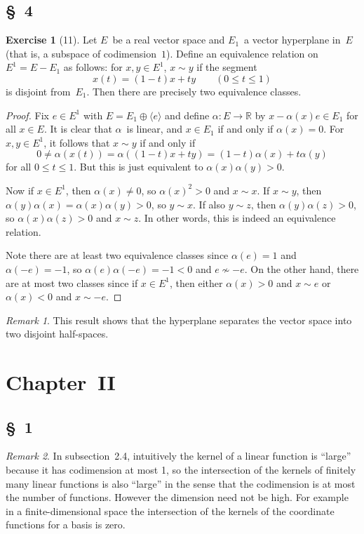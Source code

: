 \documentclass[letterpaper,12pt]{article}
\newcommand{\R}{\mathbb{R}}
\renewcommand{\equiv}{\sim}
\newcommand{\dsum}{\oplus}
\newcommand{\gen}[1]{\langle#1\rangle}
\theoremstyle{definition}
\newtheorem*{exer}{Exercise}
\theoremstyle{remark}
\newtheorem*{rmk}{Remark}
\begin{document}
\subsection*{\S~4}
\begin{exer}[11]
Let \(E\)~be a real vector space and \(E_1\)~a vector hyperplane in~\(E\) (that is, a subspace of codimension~\(1\)). Define an equivalence relation on \(E^1=E-E_1\) as follows: for \(x,y\in E^1\), \(x\equiv y\) if the segment
\[x(t)=(1-t)x+ty\qquad(0\le t\le 1)\]
is disjoint from~\(E_1\). Then there are precisely two equivalence classes.
\end{exer}
\begin{proof}
Fix \(e\in E^1\) with \(E=E_1\dsum\gen{e}\) and define \(\alpha:E\to\R\) by \(x-\alpha(x)e\in E_1\) for all \(x\in E\). It is clear that \(\alpha\)~is linear, and \(x\in E_1\) if and only if \(\alpha(x)=0\). For \(x,y\in E^1\), it follows that \(x\equiv y\) if and only if
\[0\ne\alpha(x(t))=\alpha((1-t)x+ty)=(1-t)\alpha(x)+t\alpha(y)\]
for all \(0\le t\le 1\). But this is just equivalent to \(\alpha(x)\alpha(y)>0\).

Now if \(x\in E^1\), then \(\alpha(x)\ne0\), so \(\alpha(x)^2>0\) and \(x\equiv x\). If \(x\equiv y\), then \(\alpha(y)\alpha(x)=\alpha(x)\alpha(y)>0\), so \(y\equiv x\). If also \(y\equiv z\), then \(\alpha(y)\alpha(z)>0\), so \(\alpha(x)\alpha(z)>0\) and \(x\equiv z\). In other words, this is indeed an equivalence relation.

Note there are at least two equivalence classes since \(\alpha(e)=1\) and \(\alpha(-e)=-1\), so \(\alpha(e)\alpha(-e)=-1<0\) and \(e\not\equiv -e\). On the other hand, there are at most two classes since if \(x\in E^1\), then either \(\alpha(x)>0\) and \(x\equiv e\) or \(\alpha(x)<0\) and \(x\equiv -e\).
\end{proof}
\begin{rmk}
This result shows that the hyperplane separates the vector space into two disjoint half-spaces.
\end{rmk}

\newpage
\section*{Chapter~II}
\subsection*{\S~1}
\begin{rmk}
In subsection~2.4, intuitively the kernel of a linear function is ``large'' because it has codimension at most 1, so the intersection of the kernels of finitely many linear functions is also ``large'' in the sense that the codimension is at most the number of functions. However the dimension need not be high. For example in a finite-dimensional space the intersection of the kernels of the coordinate functions for a basis is zero.
\end{rmk}
\end{document}
